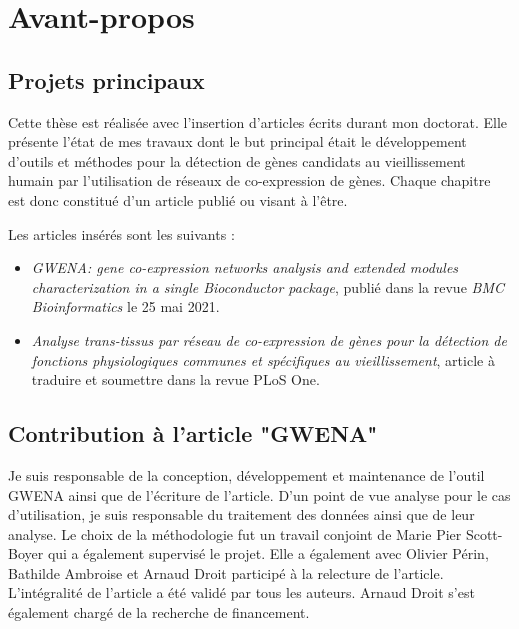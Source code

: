 \chapter*{Avant-propos}         %


\section{Projets principaux}

Cette thèse est réalisée avec l'insertion d’articles écrits durant mon doctorat. Elle présente l’état de mes travaux dont le but principal était le développement d’outils et méthodes pour la détection de gènes candidats au vieillissement humain par l'utilisation de réseaux de co-expression de gènes. Chaque chapitre est donc constitué d'un article publié ou visant à l'être.

Les articles insérés sont les suivants :
\begin{itemize}
    \item \textit{GWENA: gene co-expression networks analysis and extended modules characterization in a single Bioconductor package}, publié dans la revue \textit{BMC Bioinformatics} le 25 mai 2021.
    \item \textit{Analyse trans-tissus par réseau de co-expression de gènes pour la détection de fonctions physiologiques communes et spécifiques au vieillissement}, article à traduire et soumettre dans la revue PLoS One.
\end{itemize}


\section{Contribution à l'article "GWENA"}

Je suis responsable de la conception, développement et maintenance de l'outil GWENA ainsi que de l'écriture de l'article. D'un point de vue analyse pour le cas d'utilisation, je suis responsable du traitement des données ainsi que de leur analyse. Le choix de la méthodologie fut un travail conjoint de Marie Pier Scott-Boyer qui a également supervisé le projet. Elle a également avec Olivier Périn, Bathilde Ambroise et Arnaud Droit participé à la relecture de l'article. L'intégralité de l'article a été validé par tous les auteurs. Arnaud Droit s'est également chargé de la recherche de financement.


